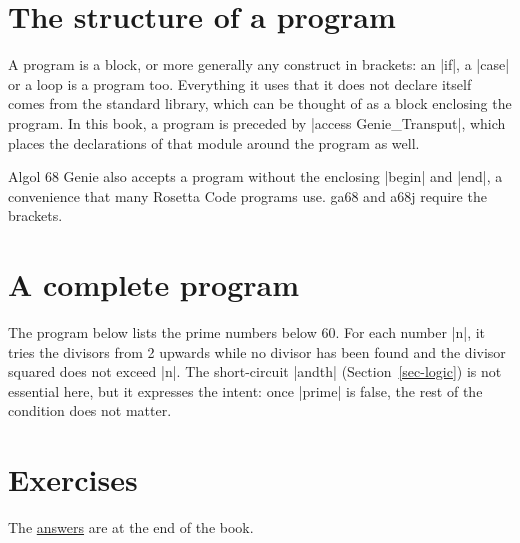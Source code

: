 \section{The structure of a program}\label{sec-program}

A program is a block, or more generally any construct in brackets: an
\code|if|, a \code|case| or a loop is a program too. Everything it uses
that it does not declare itself
comes from the standard library, which can be thought of as a block
enclosing the program. In this book, a program is preceded by
\code|access Genie_Transput|, which places the declarations of that module
around the program as well.

\begin{implnote}
Algol 68 Genie also accepts a program without the enclosing
\code|begin| and \code|end|, a convenience that many Rosetta Code
programs use. ga68 and a68j require the brackets.
\end{implnote}

\section{A complete program}\label{sec-control-complete}

The program below lists the prime numbers below 60. For each number
\code|n|, it tries the divisors from 2 upwards while no divisor has been
found and the divisor squared does not exceed \code|n|. The short-circuit
\code|andth| (Section~\ref{sec-logic}) is not essential here, but it
expresses the intent: once \code|prime| is false, the rest of the
condition does not matter.


\section*{Exercises}

The \hyperref[ans-ch3]{answers} are at the end of the book.

